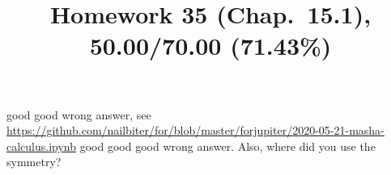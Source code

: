 \documentclass[pstricks,10pt,dvipsnames]{article} %
\title{Homework 35 (Chap.~15.1),
50.00/70.00 (71.43\%)
}
\begin{document}
\maketitle
{}
good
good
wrong answer, see \url{https://github.com/nailbiter/for/blob/master/forjupiter/2020-05-21-masha-calculus.ipynb}
good
good
good
wrong answer. Also, where did you use the symmetry?
\end{document}
